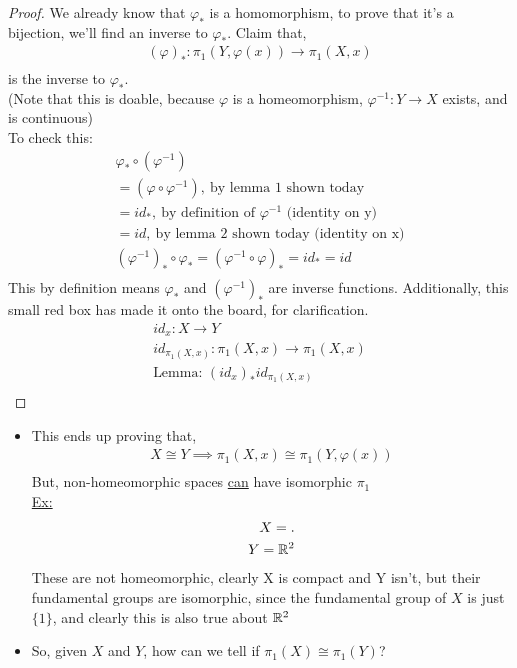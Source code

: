         \begin{proof}
            We already know that $\varphi_{*}$ is a homomorphism, to prove that it's
            a bijection, we'll find an inverse to $\varphi_{*}$. Claim that,
            \begin{align*}
                (\varphi)_{*}:\pi_1(Y,\varphi(x))\rightarrow\pi_1(X,x)\\
            \end{align*}
            is the inverse to $\varphi_{*}$.\\
            (Note that this is doable, because $\varphi$ is a homeomorphism, $\varphi^{-1}:Y\rightarrow X$ exists, and is continuous)\\
            To check this:
            \begin{align*}
                \varphi_{*}\circ (\varphi^{-1})\\
                =(\varphi\circ\varphi^{-1}),\ \text{by lemma 1 shown today}\\
                =id_{*},\ \text{by definition of $\varphi^{-1}$ (identity on y)}\\
                =id,\ \text{by lemma 2 shown today (identity on x)}\\
                (\varphi^{-1})_{*}\circ\varphi_{*}=(\varphi^{-1}\circ\varphi)_{*}=id_{*}=id\\
            \end{align*}
            This by definition means $\varphi_{*}$ and $(\varphi^{-1})_{*}$ are inverse functions.
            Additionally, this small red box has made it onto the board, for clarification.
            \begin{align*}
                id_x: X \rightarrow Y\\
                id_{\pi_1(X,x)}:\pi_1(X,x)\rightarrow\pi_1(X,x)\\
                \text{Lemma: }(id_{x})_{*}id_{\pi_1(X,x)}\\
            \end{align*}
        \end{proof}
    \begin{itemize}
        \item
            This ends up proving that,
            \begin{align*}
                X\cong Y\implies\pi_1(X,x)\cong\pi_1(Y,\varphi(x))\\
            \end{align*}
            But, non-homeomorphic spaces \underline{can} have isomorphic $\pi_{1}$\\
            \underline{Ex:}
            \begin{align*}
                X=.\\
                Y=\mathbb{R}^2\\
            \end{align*}
            These are not homeomorphic, clearly X is compact and Y isn't, but their fundamental groups are
            isomorphic, since the fundamental group of $X$ is just $\{1\}$, and clearly this is also true
            about $\mathbb{R}^2$
        \item So, given $X$ and $Y$, how can we tell if $\pi_1(X)\cong\pi_1(Y)$?
    \end{itemize}
